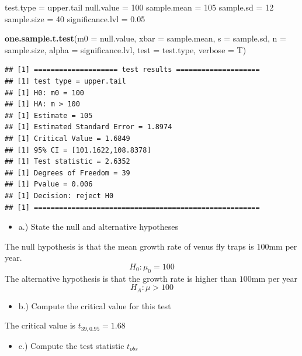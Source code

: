 \documentclass[
]{article}
\newenvironment{Shaded}{\begin{snugshade}}{\end{snugshade}}
\newcommand{\AttributeTok}[1]{\textcolor[rgb]{0.13,0.29,0.53}{#1}}
\newcommand{\DecValTok}[1]{\textcolor[rgb]{0.00,0.00,0.81}{#1}}
\newcommand{\FloatTok}[1]{\textcolor[rgb]{0.00,0.00,0.81}{#1}}
\newcommand{\FunctionTok}[1]{\textcolor[rgb]{0.13,0.29,0.53}{\textbf{#1}}}
\newcommand{\NormalTok}[1]{#1}
\newcommand{\OtherTok}[1]{\textcolor[rgb]{0.56,0.35,0.01}{#1}}
\newcommand{\StringTok}[1]{\textcolor[rgb]{0.31,0.60,0.02}{#1}}
\providecommand{\tightlist}{%
  \setlength{\itemsep}{0pt}\setlength{\parskip}{0pt}}
\begin{document}
\begin{Shaded}
\begin{Highlighting}[]
\NormalTok{test.type }\OtherTok{=} \StringTok{\textquotesingle{}upper.tail\textquotesingle{}}
\NormalTok{null.value }\OtherTok{=} \DecValTok{100}
\NormalTok{sample.mean }\OtherTok{=} \DecValTok{105}
\NormalTok{sample.sd }\OtherTok{=} \DecValTok{12}
\NormalTok{sample.size }\OtherTok{=} \DecValTok{40}
\NormalTok{significance.lvl }\OtherTok{=} \FloatTok{0.05}

\FunctionTok{one.sample.t.test}\NormalTok{(}\AttributeTok{m0 =}\NormalTok{ null.value,}
                  \AttributeTok{xbar =}\NormalTok{ sample.mean,}
                  \AttributeTok{s =}\NormalTok{ sample.sd,}
                  \AttributeTok{n =}\NormalTok{ sample.size, }
                  \AttributeTok{alpha =}\NormalTok{ significance.lvl,}
                  \AttributeTok{test =}\NormalTok{ test.type,}
                  \AttributeTok{verbose =}\NormalTok{ T)}
\end{Highlighting}
\end{Shaded}

\begin{verbatim}
## [1] ==================== test results ====================
## [1] test type = upper.tail
## [1] H0: m0 = 100
## [1] HA: m > 100
## [1] Estimate = 105
## [1] Estimated Standard Error = 1.8974
## [1] Critical Value = 1.6849
## [1] 95% CI = [101.1622,108.8378]
## [1] Test statistic = 2.6352
## [1] Degrees of Freedom = 39
## [1] Pvalue = 0.006
## [1] Decision: reject H0
## [1] ======================================================
\end{verbatim}

\begin{itemize}
\tightlist
\item
  a.) State the null and alternative hypotheses
\end{itemize}

{The null hypothesis is that the mean growth rate of venus fly traps is
\(100\)mm per year. \[H_0: \mu_0 = 100 \] The alternative hypothesis is
that the growth rate is higher than \(100\)mm per year
\[H_A: \mu > 100\] }

\begin{itemize}
\tightlist
\item
  b.) Compute the critical value for this test
\end{itemize}

{The critical value is \(t_{39, 0.95} = 1.68\)}

\begin{itemize}
\tightlist
\item
  c.) Compute the test statistic \(t_{obs}\)
\end{itemize}
\end{document}
